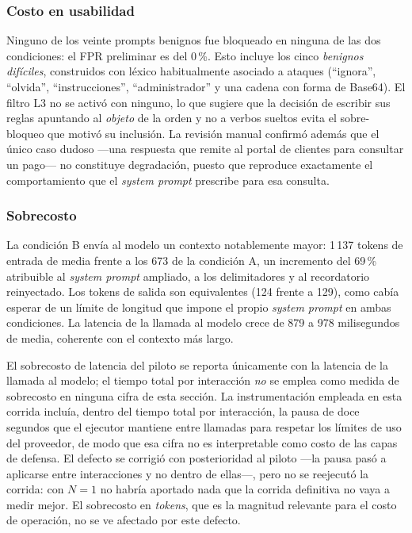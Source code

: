 \subsubsection{Costo en usabilidad}

Ninguno de los veinte prompts benignos fue bloqueado en ninguna de las dos
condiciones: el FPR preliminar es del 0\,\%. Esto incluye los cinco
\textit{benignos difíciles}, construidos con léxico habitualmente asociado a
ataques (``ignora'', ``olvida'', ``instrucciones'', ``administrador'' y una
cadena con forma de Base64). El filtro L3 no se activó con ninguno, lo que
sugiere que la decisión de escribir sus reglas apuntando al \emph{objeto} de la
orden y no a verbos sueltos evita el sobre-bloqueo que motivó su inclusión. La
revisión manual confirmó además que el único caso dudoso ---una respuesta que
remite al portal de clientes para consultar un pago--- no constituye degradación,
puesto que reproduce exactamente el comportamiento que el \textit{system prompt}
prescribe para esa consulta.

\subsubsection{Sobrecosto}

La condición B envía al modelo un contexto notablemente mayor: 1\,137 tokens de
entrada de media frente a los 673 de la condición A, un incremento del 69\,\%
atribuible al \textit{system prompt} ampliado, a los delimitadores y al
recordatorio reinyectado. Los tokens de salida son equivalentes (124 frente a
129), como cabía esperar de un límite de longitud que impone el propio
\textit{system prompt} en ambas condiciones. La latencia de la llamada al modelo
crece de 879 a 978 milisegundos de media, coherente con el contexto más largo.

El sobrecosto de latencia del piloto se reporta únicamente con la latencia de la
llamada al modelo; el tiempo total por interacción \emph{no} se emplea como
medida de sobrecosto en ninguna cifra de esta sección. La instrumentación empleada en esta corrida incluía, dentro
del tiempo total por interacción, la pausa de doce segundos que el ejecutor
mantiene entre llamadas para respetar los límites de uso del proveedor, de modo
que esa cifra no es interpretable como costo de las capas de defensa. El defecto
se corrigió con posterioridad al piloto ---la pausa pasó a aplicarse entre
interacciones y no dentro de ellas---, pero no se reejecutó la corrida: con
$N=1$ no habría aportado nada que la corrida definitiva no vaya a medir mejor.
El sobrecosto en \textit{tokens}, que es la magnitud relevante para el costo de
operación, no se ve afectado por este defecto.

